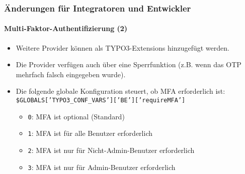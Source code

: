 %

\begin{frame}[fragile]
	\frametitle{Änderungen für Integratoren und Entwickler}
	\framesubtitle{Multi-Faktor-Authentifizierung (2)}

	\begin{itemize}

		\item Weitere Provider können als TYPO3-Extensions hinzugefügt werden.

		\item Die Provider verfügen auch über eine Sperrfunktion
			(z.B. wenn das OTP mehrfach falsch eingegeben wurde).

		\item Die folgende globale Konfiguration steuert, ob MFA erforderlich ist:\newline
			\smaller\texttt{\$GLOBALS['TYPO3\_CONF\_VARS']['BE']['requireMFA']}\normalsize

			\begin{itemize}
				\item \texttt{0}: MFA ist optional (Standard)
				\item \texttt{1}: MFA ist für alle Benutzer erforderlich
				\item \texttt{2}: MFA ist nur für Nicht-Admin-Benutzer erforderlich
				\item \texttt{3}: MFA ist nur für Admin-Benutzer erforderlich
			\end{itemize}

	\end{itemize}

\end{frame}

